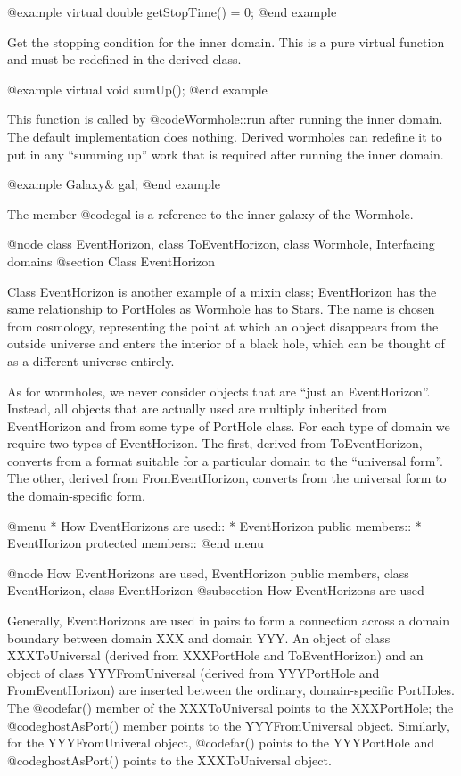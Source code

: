 @example
virtual double getStopTime() = 0;
@end example

Get the stopping condition for the inner domain.  This is a pure
virtual function and must be redefined in the derived class.

@example
virtual void sumUp();
@end example

This function is called by @code{Wormhole::run} after running the
inner domain.  The default implementation does nothing.  Derived
wormholes can redefine it to put in any ``summing up'' work that is
required after running the inner domain.

@example
Galaxy& gal;
@end example

The member @code{gal} is a reference to the inner galaxy of the Wormhole.

@node class EventHorizon, class ToEventHorizon, class Wormhole, Interfacing domains
@section Class EventHorizon

Class EventHorizon is another example of a mixin class; EventHorizon has
the same relationship to PortHoles as Wormhole has to Stars.  The name
is chosen from cosmology, representing the point at which an object
disappears from the outside universe and enters the interior of a black
hole, which can be thought of as a different universe entirely.

As for wormholes, we never consider objects that are ``just an
EventHorizon''.  Instead, all objects that are actually used are multiply
inherited from EventHorizon and from some type of PortHole class.  For
each type of domain we require two types of EventHorizon.  The first, derived
from ToEventHorizon, converts from a format suitable for a particular
domain to the ``universal form''.  The other, derived from FromEventHorizon,
converts from the universal form to the domain-specific form.

@menu
* How EventHorizons are used::
* EventHorizon public members::
* EventHorizon protected members::
@end menu

@node How EventHorizons are used, EventHorizon public members, class EventHorizon, class EventHorizon
@subsection How EventHorizons are used

Generally, EventHorizons are used in pairs to form a connection
across a domain boundary between domain XXX and domain YYY.  An object
of class XXXToUniversal (derived from XXXPortHole and ToEventHorizon)
and an object of class YYYFromUniversal (derived from YYYPortHole and
FromEventHorizon) are inserted between the ordinary, domain-specific
PortHoles.  The @code{far()} member of the XXXToUniversal points
to the XXXPortHole; the @code{ghostAsPort()} member points to
the YYYFromUniversal object.  Similarly, for the YYYFromUniveral
object, @code{far()} points to the YYYPortHole and @code{ghostAsPort()}
points to the XXXToUniversal object.

